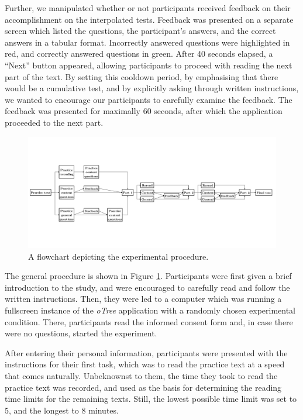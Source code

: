 Further, we manipulated whether or not participants received feedback on
their accomplishment on the interpolated tests. Feedback was presented
on a separate screen which listed the questions, the participant's
answers, and the correct answers in a tabular format. Incorrectly
answered questions were highlighted in red, and correctly answered
questions in green. After 40 seconds elapsed, a ``Next'' button
appeared, allowing participants to proceed with reading the next part of
the text. By setting this cooldown period, by emphasising that there
would be a cumulative test, and by explicitly asking through written
instructions, we wanted to encourage our participants to carefully
examine the feedback. The feedback was presented for maximally 60
seconds, after which the application proceeded to the next part.

\begin{figure}[p]
  \centering
  \includegraphics[width = 1.3\textwidth, keepaspectratio, angle = 90, trim = 0 0 0 0]{images/procedure.pdf}
  \caption{A flowchart depicting the experimental procedure.}
  \label{flowchart}
\end{figure}

The general procedure is shown in Figure \ref{flowchart}. Participants
were first given a brief introduction to the study, and were encouraged
to carefully read and follow the written instructions. Then, they were
led to a computer which was running a fullscreen instance of the
\textit{oTree} application with a randomly chosen experimental
condition. There, participants read the informed consent form and, in
case there were no questions, started the experiment.

After entering their personal information, participants were presented
with the instructions for their first task, which was to read the
practice text at a speed that comes naturally. Unbeknownst to them, the time 
they took to read the practice text was recorded, and used as the basis for 
determining the reading time limits for the remaining texts. Still, the 
lowest possible time limit was set to 5, and the longest to 8 minutes.

